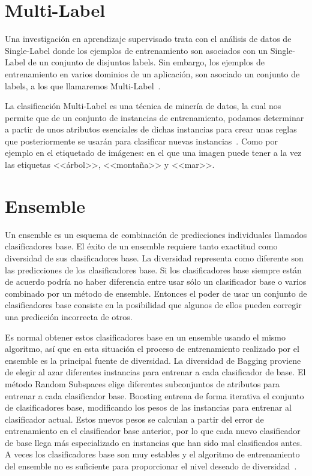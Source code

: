 \section{Multi-Label}
Una investigación en aprendizaje supervisado trata con el análisis de datos de Single-Label donde los ejemplos de entrenamiento son asociados con un Single-Label de un conjunto de disjuntos labels. Sin embargo, los ejemplos de entrenamiento en varios dominios de un aplicación, son asociado un conjunto de labels, a los que llamaremos Multi-Label~\cite{multilabel2}.

La clasificación Multi-Label es una técnica de minería de datos, la cual nos permite que de un conjunto de instancias de entrenamiento, podamos determinar a partir de unos atributos esenciales de dichas instancias para crear unas reglas que posteriormente se usarán para clasificar nuevas instancias~\cite{multilabel}. Como por ejemplo en el etiquetado de imágenes: en el que una imagen puede tener a la vez las etiquetas <<árbol>>, <<montaña>> y <<mar>>.   

\section{Ensemble}
Un ensemble es un esquema de combinación de predicciones individuales llamados clasificadores base. El éxito de un ensemble requiere tanto exactitud como diversidad de sus clasificadores base. La diversidad representa como diferente son las predicciones de los clasificadores base. Si los clasificadores base siempre están de acuerdo podría no haber diferencia entre usar sólo un clasificador base o varios combinado por un método de ensemble. Entonces el poder de usar un conjunto de clasificadores base consiste en la posibilidad que algunos de ellos pueden corregir una predicción incorrecta de otros.

Es normal obtener estos clasificadores base en un ensemble usando el mismo algoritmo, así que en esta situación el proceso de entrenamiento realizado por el ensemble es la principal fuente de diversidad. La diversidad de Bagging proviene de elegir al azar diferentes instancias para entrenar a cada clasificador de base. El método Random Subspaces elige diferentes subconjuntos de atributos para entrenar a cada clasificador base. Boosting entrena de forma iterativa el conjunto de clasificadores base, modificando los pesos de las instancias para entrenar al clasificador actual. Estos nuevos pesos se calculan a partir del error de entrenamiento en el clasificador base anterior, por lo que cada nuevo clasificador de base llega más especializado en instancias que han sido mal clasificados antes. A veces los clasificadores base son muy estables y el  algoritmo de entrenamiento del ensemble no es suficiente para proporcionar el nivel deseado de diversidad~\cite{disturbingneighbors}.

